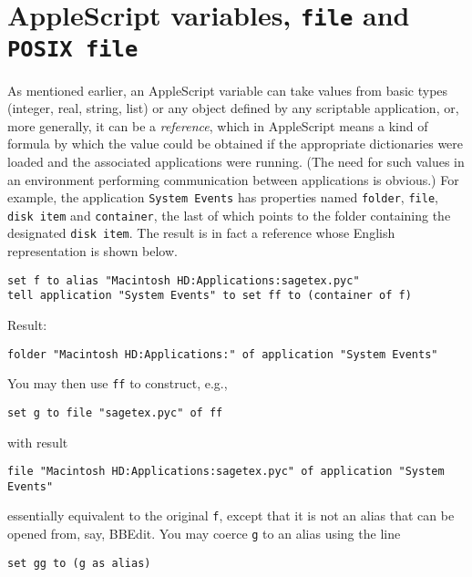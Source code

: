 \documentclass[11pt]{amsart}
\begin{document}
\section{AppleScript variables, {\tt file} and {\tt POSIX file}}
As mentioned earlier, an AppleScript variable can take values from basic types  (integer, real, string, list) or any object defined by any scriptable application, or, more generally, it can be a \emph{reference}, which in AppleScript means a kind of formula by which the value could be obtained if the appropriate dictionaries were loaded and the associated applications were running. (The need for such values in an environment performing communication between applications is obvious.)  For example, the application {\tt System Events} has  properties named {\tt folder}, {\tt file}, {\tt disk item} and {\tt container}, the last of which points to the folder containing the designated {\tt disk item}. The result is in fact a reference whose English representation is shown below.
\begin{verbatim}
set f to alias "Macintosh HD:Applications:sagetex.pyc"
tell application "System Events" to set ff to (container of f)
\end{verbatim}
Result:
\begin{verbatim}
folder "Macintosh HD:Applications:" of application "System Events"
\end{verbatim}
You may then use {\tt ff} to construct, e.g.,
\begin{verbatim}
set g to file "sagetex.pyc" of ff 
\end{verbatim}
with result
\begin{verbatim}
file "Macintosh HD:Applications:sagetex.pyc" of application "System Events"
\end{verbatim}
essentially equivalent to the original {\tt f}, except that it is not an alias that can be opened from, say, BBEdit. You may coerce {\tt g} to an alias using the line
\begin{verbatim}
set gg to (g as alias)
\end{verbatim}
\end{document}
